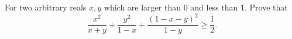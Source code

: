 For two arbitrary reals $x, y$ which are larger than $0$ and less than $1.$ Prove that$$\frac{x^2}{x+y}+\frac{y^2}{1-x}+\frac{(1-x-y)^2}{1-y}\geq\frac{1}{2}.$$